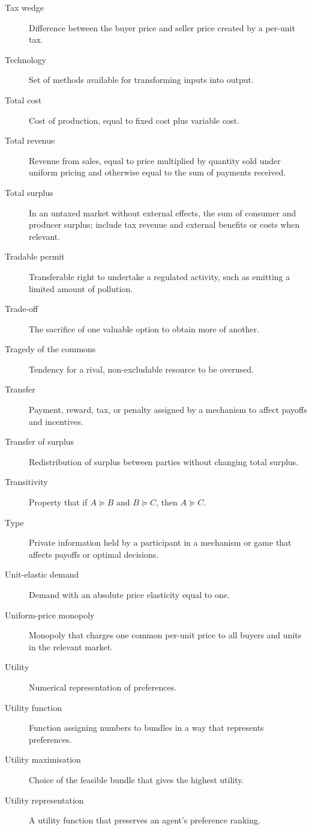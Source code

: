 \begin{description}
  \item[Tax wedge] Difference between the buyer price and seller price created by a per-unit tax.
  \item[Technology] Set of methods available for transforming inputs into output.
  \item[Total cost] Cost of production, equal to fixed cost plus variable cost.
  \item[Total revenue] Revenue from sales, equal to price multiplied by
  quantity sold under uniform pricing and otherwise equal to the sum of
  payments received.
  \item[Total surplus] In an untaxed market without external effects, the sum
  of consumer and producer surplus; include tax revenue and external benefits
  or costs when relevant.
  \item[Tradable permit] Transferable right to undertake a regulated activity, such as emitting a limited amount of pollution.
  \item[Trade-off] The sacrifice of one valuable option to obtain more of another.
  \item[Tragedy of the commons] Tendency for a rival, non-excludable resource to be overused.
  \item[Transfer] Payment, reward, tax, or penalty assigned by a mechanism to affect payoffs and incentives.
  \item[Transfer of surplus] Redistribution of surplus between parties without changing total surplus.
  \item[Transitivity] Property that if $A\succeq B$ and $B\succeq C$, then $A\succeq C$.
  \item[Type] Private information held by a participant in a mechanism or game that affects payoffs or optimal decisions.
  \item[Unit-elastic demand] Demand with an absolute price elasticity equal to one.
  \item[Uniform-price monopoly] Monopoly that charges one common per-unit
  price to all buyers and units in the relevant market.
  \item[Utility] Numerical representation of preferences.
  \item[Utility function] Function assigning numbers to bundles in a way that represents preferences.
  \item[Utility maximisation] Choice of the feasible bundle that gives the highest utility.
  \item[Utility representation] A utility function that preserves an agent's preference ranking.

\end{description}
